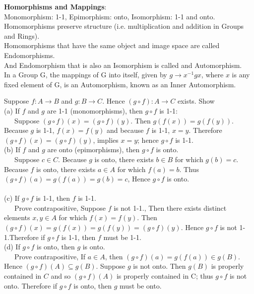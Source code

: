 \begin{definition}{\bf Homorphisms and Mappings}:\\
Monomorphism: 1-1, Epimorphism: onto, Isomorphism: 1-1 and onto.\\ Homomorphisms preserve structure (i.e. multiplication and addition in Groups and Rings). \\
Homomorphisms that have the same object and image space are called Endomorphisms.\\ And Endomorphism that is also an Isomorphism is called and Automorphism.\\
In a Group G, the mappings of G into itself, given by $g\rightarrow x^{-1} g x$, where $x$ is any fixed element of G, is an Automorphism, known as an Inner Automorphism.\\ 
\end{definition}

Suppose $f: A \rightarrow B$ and $g: B\rightarrow C$. Hence $(g\circ f) : A \rightarrow C$ exists. Show\\
(a) If $f$ and $g$ are 1-1 (monomorphisms), then $g\circ f$ is 1-1:\\
~~~Suppose $(g\circ f)(x) = (g\circ f)(y)$. Then $g(f(x)) = g(f(y))$. Because $g$ is 1-1, $f(x) = f(y)$ and because $f$ is 1-1, $x = y$. Therefore $(g\circ f)(x) = (g\circ f)(y)$, implies $x = y$; hence $g\circ f$ is 1-1. \\
(b) If $f$ and $g$ are onto (epimorphisms), then $g\circ f$ is onto.\\
~~~Suppose $c \in C$. Because $g$ is onto, there exists $b \in B$ for which $g(b) = c$. Because $f$ is onto, there exists $a\in A$ for which $f(a) = b$. Thus  $(g\circ f)(a) = g(f(a)) = g(b) = c$, Hence $g\circ f$ is onto. \\ \\
(c) If $g\circ f$ is 1-1, then $f$ is 1-1.\\ 
~~~Prove contrapositive, Suppose $f$ is  not 1-1., Then there exists distinct elements $x,y \in A$ for which $f(x) = f(y)$. Then $(g\circ f)(x) = g(f(x)) = g(f(y)) = (g\circ f)(y)$. Hence $g\circ f$ is not 1-1.Therefore if $g\circ f$ is 1-1, then $f$ must be 1-1.\\
(d) If $g\circ f$ is onto, then $g$ is onto.\\
~~~Prove contrapositive, If $a \in A$, then $(g\circ f)(a) = g(f(a)) \in g(B)$. Hence $(g\circ f)(A) \subseteq g(B)$. 
Suppose $g$ is not onto. Then $g(B)$ is properly contained in $C$ and so $(g\circ f)(A)$ is properly contained in C; thus $g\circ f$ is not onto. Therefore if $g\circ f$ is onto, then $g$ must be onto.\\

